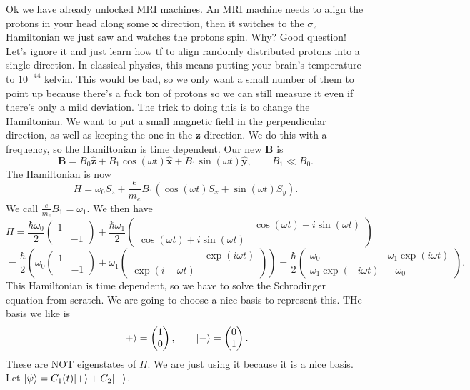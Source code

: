 Ok we have already unlocked MRI machines. An MRI machine needs to align the protons in your head along some $\mathbf{x} $ direction, then it switches to the $\sigma_z$ Hamiltonian we just saw and watches the protons spin. Why? Good question! Let's ignore it and just learn how tf to align randomly distributed protons into a single direction. In classical physics, this means putting your brain's temperature to $10^{-44} $ kelvin. This would be bad, so we only want a small number of them to point up because there's a fuck ton of protons so we can still measure it even if there's only a mild deviation. The trick to doing this is to change the Hamiltonian. We want to put a small magnetic field in the perpendicular direction, as well as keeping the one in the $\mathbf{z} $ direction. We do this with a frequency, so the Hamiltonian is time dependent. Our new $\mathbf{B}$ is
\[
	\mathbf{B} =B_0 \mathbf{\hat{z} }+B_1 \cos (\omega t)\mathbf{\hat{x} } +B_1\sin (\omega t)\mathbf{\hat{y} } ,\qquad B_1\ll B_0
.\]
The Hamiltonian is now
\[
	H=\omega_0 S_z + \frac{e}{m_e} B_1 \left( \cos (\omega t)S_x+\sin (\omega t)S_y \right) 
.\]
We call $\frac{e}{m_e} B_1=\omega _1$. We then have
\[
	H=\frac{\hbar \omega _0}{2} \begin{pmatrix}
	1 &  \\
	 & -1
	\end{pmatrix}+\frac{\hbar \omega _1}{2} \begin{pmatrix}
	 & \cos(\omega t) -i \sin (\omega t) \\
	\cos (\omega t)+i \sin (\omega t) & 
	\end{pmatrix}
\]
\[
	=\frac{\hbar }{2} \left( \omega_0 \begin{pmatrix}
	1 &  \\
	 & -1
	\end{pmatrix}+\omega_1\begin{pmatrix}
	 & \exp (i\omega t) \\
	\exp (i-\omega t) & 
	\end{pmatrix} \right) = \frac{\hbar }{2} \begin{pmatrix}
	\omega _0 & \omega _1 \exp (i\omega t) \\
	\omega _1 \exp (-i\omega t) & -\omega_0
	\end{pmatrix}
.\]
This Hamiltonian is time dependent, so we have to solve the Schrodinger equation from scratch. We are going to choose a nice basis to represent this. THe basis we like is
\[
	\lvert+\rangle =\begin{pmatrix}
	1 \\
	0
\end{pmatrix},\qquad \lvert-\rangle =\begin{pmatrix}
0 \\
1
\end{pmatrix}
.\]
These are NOT eigenstates of $H$. We are just using it because it is a nice basis. Let $\lvert\psi \rangle =C_1(t)\lvert+\rangle +C_2\lvert-\rangle $.
